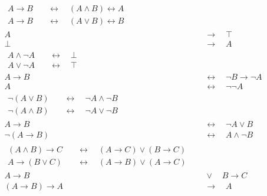 \begin{align*}
    \begin{split}
        A \to B & \quad\leftrightarrow\quad (A \land B) \leftrightarrow A \\
        A \to B & \quad\leftrightarrow\quad (A \lor B) \leftrightarrow B
    \end{split} \\[0.8em]
    A & \quad\to\quad \top \tag{Wahres folgt aus Beliebigem} \\
    \bot & \quad\to\quad A \tag{ex falso quodlibet} \\[0.8em]
    \begin{split}
        A \land \neg A & \quad\leftrightarrow\quad \bot \\
        A \lor \neg A & \quad\leftrightarrow\quad \top
    \end{split} \\[0.8em]
    A \to B & \quad \leftrightarrow\quad \neg B \to \neg A \\
    A & \quad\leftrightarrow\quad \neg\neg A \tag{Regel der doppelten Verneinung} \\[0.8em]
    \begin{split}
        \neg (A \lor B) & \quad\leftrightarrow\quad \neg A \land \neg B\\
        \neg(A \land B) & \quad\leftrightarrow\quad \neg A \lor \neg B  %
    \end{split} \tag{Regeln von De Morgan} \\[0.8em]
    A\to B & \quad\leftrightarrow\quad  \neg A \lor B \\
    \neg (A\to B) & \quad\leftrightarrow\quad  A \land \neg B \\[0.8em]
    \begin{split}
        (A\land B) \to C & \quad\leftrightarrow\quad (A\to C) \lor (B\to C) \\ %
        A \to (B\lor C) & \quad\leftrightarrow\quad (A\to B) \lor (A\to C) %
    \end{split} \\[0.8em]
    A\to B & \quad \lor\quad B\to C \\
    (A\to B)\to A &\quad \to\quad A \tag{Peirce’sche Regel}
\end{align*}
\endgroup

 
 
 
 
